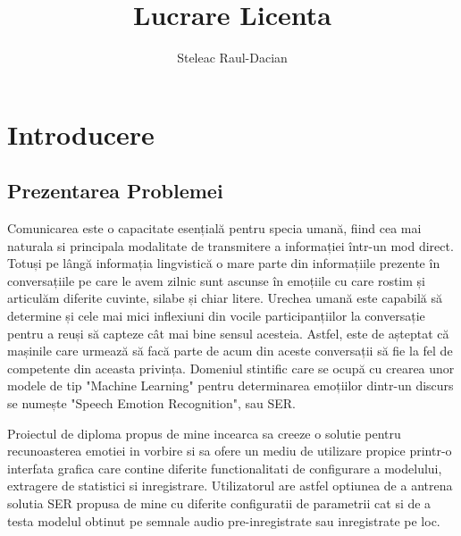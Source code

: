 \documentclass[a4paper,12pt]{book}
\title{Lucrare Licenta}
\author{Steleac Raul-Dacian}
\begin{document}
	
	\clearpage
	\thispagestyle{empty}
	\tableofcontents
	\thispagestyle{empty}
	\clearpage
	\newpage 
	\thispagestyle{empty}
	
	\chapter{Introducere}
	
		\section{Prezentarea Problemei}
						
			\setlength{\parindent}{0.8cm}
			
			Comunicarea este o capacitate esențială pentru specia umană, fiind cea mai naturala si principala modalitate de transmitere a informației într-un mod direct. Totuși pe lângă informația lingvistică o mare parte din informațiile prezente în conversațiile pe care le avem zilnic sunt ascunse în emoțiile cu care rostim și articulăm diferite cuvinte, silabe și chiar litere. Urechea umană este capabilă să determine și cele mai mici inflexiuni din vocile participanțiilor la conversație pentru a reuși să capteze cât mai bine sensul acesteia. Astfel, este de așteptat că mașinile care urmează să facă parte de acum din aceste conversații să fie la fel de competente din aceasta privința. Domeniul stintific care se ocupă cu crearea unor modele de tip "Machine Learning" pentru determinarea emoțiilor dintr-un discurs se numește "Speech Emotion Recognition", sau SER. \par
			
			Proiectul de diploma propus de mine incearca sa creeze o solutie pentru recunoasterea emotiei in vorbire si sa ofere un mediu de utilizare propice printr-o interfata grafica care contine diferite functionalitati de configurare a modelului, extragere de statistici si inregistrare. Utilizatorul are astfel optiunea de a antrena solutia SER propusa de mine cu diferite configuratii de parametrii cat si de a testa modelul obtinut pe semnale audio pre-inregistrate sau inregistrate pe loc.\par
			
\end{document}
